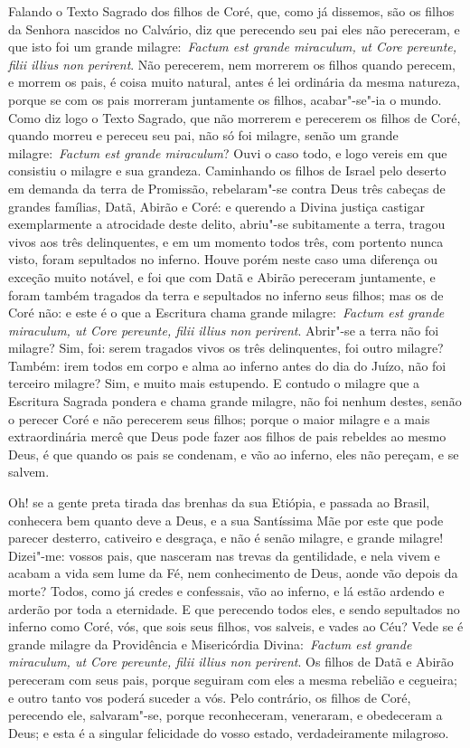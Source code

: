 Falando o Texto Sagrado dos filhos de Coré, que, como já
dissemos, são os filhos da Senhora nascidos no Calvário, diz que
perecendo seu pai eles não pereceram, e que isto foi um grande
milagre:~\emph{Factum est grande miraculum, ut Core pereunte, filii
illius non perirent}. Não perecerem, nem morrerem os
filhos quando perecem, e morrem os pais, é coisa muito natural, antes é
lei ordinária da mesma natureza, porque se com os pais morreram
juntamente os filhos, acabar"-se"-ia o mundo. Como diz logo o Texto
Sagrado, que não morrerem e perecerem os filhos de Coré, quando morreu e
pereceu seu pai, não só foi milagre, senão um grande
milagre:~\emph{Factum est grande miraculum}? Ouvi o caso todo, e logo
vereis em que consistiu o milagre e sua grandeza. Caminhando os filhos
de Israel pelo deserto em demanda da terra de Promissão, rebelaram"-se
contra Deus três cabeças de grandes famílias, Datã, Abirão e Coré: e
querendo a Divina justiça castigar exemplarmente a atrocidade deste
delito, abriu"-se subitamente a terra, tragou vivos aos três
delinquentes, e em um momento todos três, com portento nunca visto,
foram sepultados no inferno. Houve porém neste caso uma diferença ou
exceção muito notável, e foi que com Datã e Abirão pereceram juntamente,
e foram também tragados da terra e sepultados no inferno seus filhos;
mas os de Coré não: e este é o que a Escritura chama grande
milagre:~\emph{Factum est grande miraculum, ut Core pereunte, filii
illius non perirent}. Abrir"-se a terra não foi milagre? Sim, foi: serem
tragados vivos os três delinquentes, foi outro milagre? Também: irem
todos em corpo e alma ao inferno antes do dia do Juízo, não foi terceiro
milagre? Sim, e muito mais estupendo. E contudo o milagre que a
Escritura Sagrada pondera e chama grande milagre, não foi nenhum destes,
senão o perecer Coré e não perecerem seus filhos; porque o maior milagre
e a mais extraordinária mercê que Deus pode fazer aos filhos de pais
rebeldes ao mesmo Deus, é que quando os pais se condenam, e vão ao
inferno, eles não pereçam, e se salvem.


Oh! se a gente preta tirada das brenhas da sua Etiópia, e
passada ao Brasil, conhecera bem quanto deve a Deus, e a sua Santíssima
Mãe por este que pode parecer desterro, cativeiro e desgraça, e não é
senão milagre, e grande milagre! Dizei"-me: vossos pais, que nasceram nas
trevas da gentilidade, e nela vivem e acabam a vida sem lume da Fé, nem
conhecimento de Deus, aonde vão depois da morte? Todos, como já credes e
confessais, vão ao inferno, e lá estão ardendo e arderão por toda a
eternidade. E que perecendo todos eles, e sendo sepultados no inferno
como Coré, vós, que sois seus filhos, vos salveis, e vades ao Céu? Vede
se é grande milagre da Providência e Misericórdia Divina:~\emph{Factum
est grande miraculum, ut Core pereunte, filii illius non perirent}. Os
filhos de Datã e Abirão pereceram com seus pais, porque seguiram com
eles a mesma rebelião e cegueira; e outro tanto vos poderá suceder a
vós. Pelo contrário, os filhos de Coré, perecendo ele, salvaram"-se,
porque reconheceram, veneraram, e obedeceram a Deus; e esta é a singular
felicidade do vosso estado, verdadeiramente milagroso.

